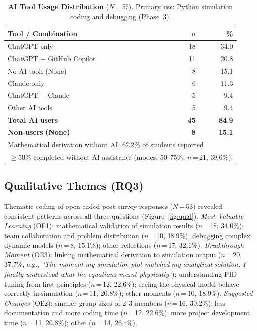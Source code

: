 \documentclass[utf8]{FrontiersinHarvard}
\begin{document}
\begin{table}[h]
\caption{\textbf{AI Tool Usage Distribution} ($N$\,=\,53). Primary use:
Python simulation coding and debugging (Phase~3).}
\label{tab:ai}
\begin{tabular}{lrr}
\toprule
\textbf{Tool / Combination} & $n$ & \textbf{\%} \\
\midrule
ChatGPT only                    & 18 & 34.0 \\
ChatGPT + GitHub Copilot        & 11 & 20.8 \\
No AI tools (None)              &  8 & 15.1 \\
Claude only                     &  6 & 11.3 \\
ChatGPT + Claude                &  5 &  9.4 \\
Other AI tools                  &  5 &  9.4 \\
\midrule
\textbf{Total AI users}         & \textbf{45} & \textbf{84.9} \\
\textbf{Non-users (None)}       & \textbf{8}  & \textbf{15.1} \\
\bottomrule
\multicolumn{3}{l}{\small Mathematical derivation without AI: 62.2\% of students reported} \\
\multicolumn{3}{l}{\small \,$\geq$50\% completed without AI assistance (modes: 50--75\%, $n$\,=\,21, 39.6\%).}
\end{tabular}
\end{table}

\subsection{Qualitative Themes (RQ3)}

Thematic coding of open-ended post-survey responses ($N$\,=\,53) revealed
consistent patterns across all three questions (Figure~\ref{fig:qual}).
\textit{Most Valuable Learning} (OE1): mathematical validation of simulation
results ($n$\,=\,18, 34.0\%); team collaboration and problem distribution
($n$\,=\,10, 18.9\%); debugging complex dynamic models ($n$\,=\,8, 15.1\%);
other reflections ($n$\,=\,17, 32.1\%). \textit{Breakthrough Moment} (OE3):
linking mathematical derivation to simulation output ($n$\,=\,20, 37.7\%,
e.g., \textit{``The moment my simulation plot matched my analytical
solution, I finally understood what the equations meant physically''});
understanding PID tuning from first principles ($n$\,=\,12, 22.6\%); seeing
the physical model behave correctly in simulation ($n$\,=\,11, 20.8\%); other
moments ($n$\,=\,10, 18.9\%). \textit{Suggested Changes} (OE2): smaller
group sizes of 2--3 members ($n$\,=\,16, 30.2\%); less documentation and more
coding time ($n$\,=\,12, 22.6\%); more project development time ($n$\,=\,11,
20.8\%); other ($n$\,=\,14, 26.4\%).
\end{document}
